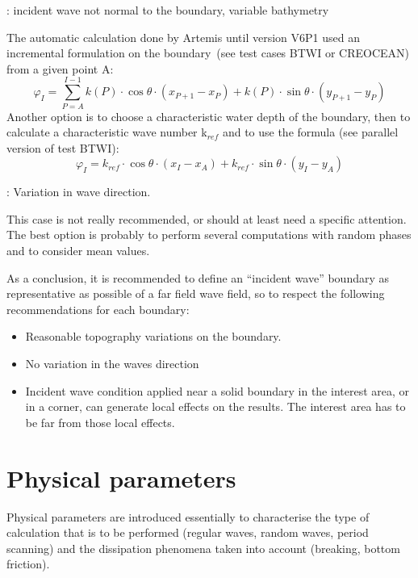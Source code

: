 : incident wave not normal to the boundary, variable bathymetry

The automatic calculation done by Artemis until version V6P1 used an
incremental formulation on the boundary~(see test cases BTWI or CREOCEAN) from
a given point A:
\[\varphi _{I} =\sum _{P=A}^{I-1}k(P)\cdot \cos \theta \cdot \left(x_{P+1} -x_{P} \right) +k(P)\cdot \sin \theta \cdot \left(y_{P+1} -y_{P} \right)\]
Another option is to choose a characteristic water depth of the boundary, then
to calculate a characteristic wave number k${}_{ref}$ and to use the formula
(see parallel version of test BTWI):
\[\varphi _{I} =k_{ref} \cdot \cos \theta \cdot (x_{I} -x_{A} )+k_{ref} \cdot \sin \theta \cdot (y_{I} -y_{A} )\]


: Variation in wave direction.

This case is not really recommended, or should at least need a specific
attention. The best option is probably to perform several computations with
random phases and to consider mean values.



As a conclusion, it is recommended to define an ``incident wave'' boundary as
representative as possible of a far field wave field, so to respect the
following recommendations for each boundary:

\begin{itemize}
\item  Reasonable topography variations on the boundary.

\item  No variation in the waves direction

\item  Incident wave condition applied near a solid boundary in the interest area, or in a corner, can generate local effects on the results. The interest area has to be far from those local effects.
\end{itemize}

\eject


\chapter{Physical parameters}

Physical parameters are introduced essentially to characterise the type of
calculation that is to be performed (regular waves, random waves, period
scanning) and the dissipation phenomena taken into account (breaking, bottom
friction).

